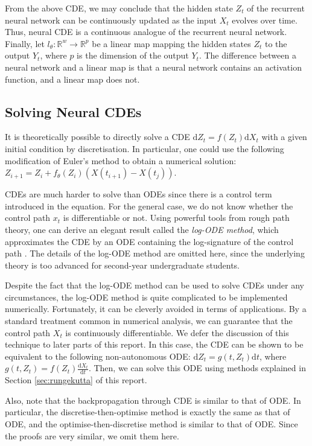\documentclass[a4paper,11pt,titlepage]{article}
\theoremstyle{definition}
\theoremstyle{plain}
\theoremstyle{remark}
\begin{document}
From the above CDE, we may conclude that the hidden state $Z_t$ of the recurrent neural network can be continuously updated as the input $X_t$ evolves over time. Thus, neural CDE is a continuous analogue of the recurrent neural network. Finally, let $l_\theta:\mathbb{R}^w\rightarrow\mathbb{R}^p$ be a linear map mapping the hidden states $Z_t$ to the output $Y_t$, where $p$ is the dimension of the output $Y_t$. The difference between a neural network and a linear map is that a neural network contains an activation function, and a linear map does not.

\subsection{Solving Neural CDEs}

It is theoretically possible to directly solve a CDE $\mathrm{d}Z_t = f(Z_t)\mathrm{d}X_t$ with a given initial condition by discretisation. In particular, one could use the following modification of Euler's method to obtain a numerical solution: $Z_{i+1}=Z_i+f_\theta(Z_i)(X(t_{i+1})-X(t_j))$.

CDEs are much harder to solve than ODEs since there is a control term introduced in the equation. For the general case, we do not know whether the control path $x_t$ is differentiable or not. Using powerful tools from rough path theory, one can derive an elegant result called the \textit{log-ODE method}, which approximates the CDE by an ODE containing the log-signature of the control path \cite{morrill2021}. The details of the log-ODE method are omitted here, since the underlying theory is too advanced for second-year undergraduate students.

Despite the fact that the log-ODE method can be used to solve CDEs under any circumstances, the log-ODE method is quite complicated to be implemented numerically. Fortunately, it can be cleverly avoided in terms of applications. By a standard treatment common in numerical analysis, we can guarantee that the control path $X_t$ is continuously differentiable. We defer the discussion of this technique to later parts of this report. In this case, the CDE can be shown to be equivalent to the following non-autonomous ODE: $\mathrm{d}Z_t=g(t,Z_t)\mathrm{d}t$, where $g(t,Z_t)=f(Z_t)\frac{\mathrm{d}X_t}{\mathrm{d}t}$. Then, we can solve this ODE using methods explained in Section \ref{sec:rungekutta} of this report.

Also, note that the backpropagation through CDE is similar to that of ODE. In particular, the discretise-then-optimise method is exactly the same as that of ODE, and the optimise-then-discretise method is similar to that of ODE. Since the proofs are very similar, we omit them here.
\end{document}
